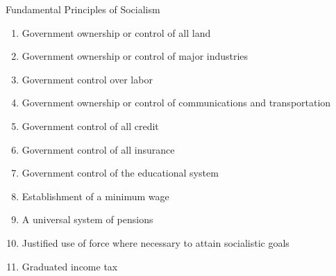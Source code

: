\begin{frame}{Fundamental Principles of Socialism}
    \begin{enumerate}
        \item Government ownership or control of all land
        \item Government ownership or control of major industries
        \item Government control over labor
        \item Government ownership or control of communications and transportation
        \item Government control of all credit
        \item Government control of all insurance
        \item Government control of the educational system
        \item Establishment of a minimum wage
        \item A universal system of pensions
        \item Justified use of force where necessary to attain socialistic goals
        \item Graduated income tax
    \end{enumerate}
\end{frame}

